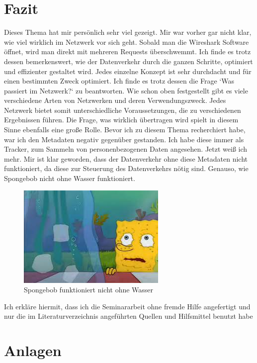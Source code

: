 \documentclass[12pt]{article}
\begin{document}
\section{Fazit}

Dieses Thema hat mir persönlich sehr viel gezeigt. Mir war vorher gar nicht klar, wie viel wirklich im Netzwerk vor sich geht. Sobald man die Wireshark Software öffnet, wird man direkt mit mehreren Requests überschwemmt. Ich finde es trotz dessen bemerkenswert, wie der Datenverkehr durch die ganzen Schritte, optimiert und effizienter gestaltet wird. Jedes einzelne Konzept ist sehr durchdacht und für einen bestimmten Zweck optimiert. Ich finde es trotz dessen die Frage `Was passiert im Netzwerk?` zu beantworten. Wie schon oben festgestellt gibt es viele verschiedene Arten von Netzwerken und deren Verwendungszweck. Jedes Netzwerk bietet somit unterschiedliche Voraussetzungen, die zu verschiedenen Ergebnissen führen. Die Frage, was wirklich übertragen wird spielt in diesem Sinne ebenfalls eine große Rolle. Bevor ich zu diesem Thema recherchiert habe, war ich den Metadaten negativ gegenüber gestanden. Ich habe diese immer als Tracker, zum Sammeln von personenbezogenen Daten angesehen. Jetzt weiß ich mehr. Mir ist klar geworden, dass der Datenverkehr ohne diese Metadaten nicht funktioniert, da diese zur Steuerung des Datenverkehrs nötig sind. Genauso, wie Spongebob nicht ohne Wasser funktioniert. 


\begin{figure}[h]
	\centering
	\includegraphics[scale=0.5]{Bilder/Spongebob}
	\caption{Spongebob funktioniert nicht ohne Wasser\cite{spongebob}}
	\label{fig:figure99}
\end{figure}








\newpage
 \listoffigures
 \listoftables
\newpage



\newpage


\large{Ich erkläre hiermit, dass ich die Seminararbeit ohne fremde Hilfe angefertigt und nur die im Literaturverzeichnis angeführten Quellen und Hilfsmittel benutzt habe}
\newpage
\centering
\vspace*{200pt}
\Huge{\section{Anlagen}}
\newpage
\end{document}
